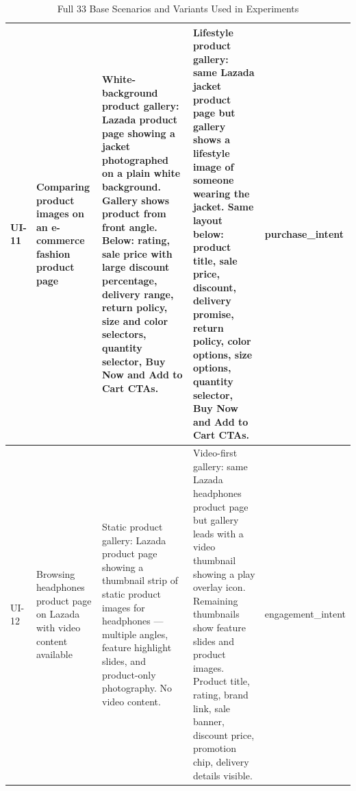 \begin{table}[h]
\begin{tabular}{p{1.5cm} p{3.5cm} p{4cm} p{4cm} p{2cm}}
\midrule
UI-11 & Comparing product images on an e-commerce fashion product page & White-background product gallery: Lazada product page showing a jacket photographed on a plain white background. Gallery shows product from front angle. Below: rating, sale price with large discount percentage, delivery range, return policy, size and color selectors, quantity selector, Buy Now and Add to Cart CTAs. & Lifestyle product gallery: same Lazada jacket product page but gallery shows a lifestyle image of someone wearing the jacket. Same layout below: product title, sale price, discount, delivery promise, return policy, color options, size options, quantity selector, Buy Now and Add to Cart CTAs. & purchase_intent \\
\midrule
UI-12 & Browsing headphones product page on Lazada with video content available & Static product gallery: Lazada product page showing a thumbnail strip of static product images for headphones — multiple angles, feature highlight slides, and product-only photography. No video content. & Video-first gallery: same Lazada headphones product page but gallery leads with a video thumbnail showing a play overlay icon. Remaining thumbnails show feature slides and product images. Product title, rating, brand link, sale banner, discount price, promotion chip, delivery details visible. & engagement_intent \\
\midrule
\bottomrule
\end{tabular}
\caption{Full 33 Base Scenarios and Variants Used in Experiments}
\label{tab:full_scenarios}
\end{table}
